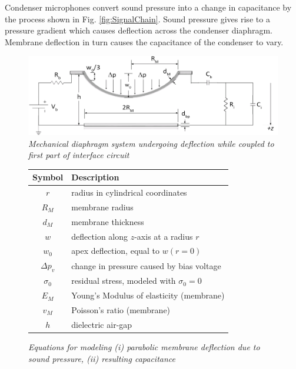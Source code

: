 \documentclass[journal]{IEEEtran}
\begin{document}
Condenser microphones convert sound pressure into a change in capacitance by the process shown in Fig. \ref{fig:SignalChain}. Sound pressure gives rise to a pressure gradient which causes deflection across the condenser diaphragm. Membrane deflection in turn  causes the capacitance of the condenser to vary. %

\begin{figure}[ht]
	\centering
	\includegraphics[scale=0.4]{CouplingCircuit.png}
	\caption{\em Mechanical diaphragm system undergoing deflection while coupled to first part of interface circuit}
	\label{fig:CouplingCircuit}
\end{figure}


\begin{figure}[ht]
	\centering	
	\begin{tabular}{ c | l }
		\hline
		\bf Symbol & \bf Description \\
		\hline
		$r$ & radius in cylindrical coordinates \\
		$R_M$ & membrane radius \\
		$d_M$ & membrane thickness \\
		$w$ & deflection along $z$-axis at a radius $r$ \\
		$w_0$ & apex deflection, equal to $w(r=0)$ \\
		$\Delta p_v$ & change in pressure caused by bias voltage \\
		$\sigma_0$ & residual stress, modeled with $\sigma_0=0$ \\
		$E_M$ & Young's Modulus of elasticity (membrane) \\
		$v_M$ & Poisson's ratio (membrane) \\
		$h$ & dielectric air-gap
	\end{tabular}
	
	\caption{\em Equations for modeling (i) parabolic membrane deflection due to sound pressure, (ii) resulting capacitance}
	\label{fig:MembraneDeflection}
\end{figure}
\end{document}
